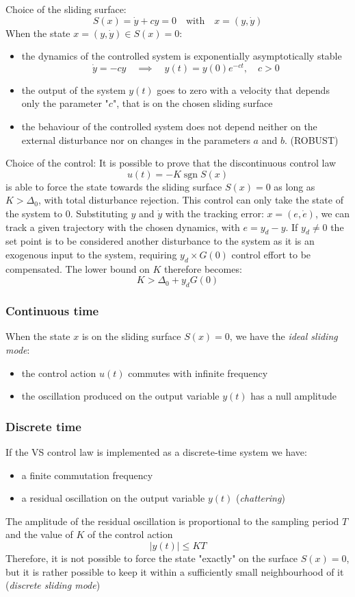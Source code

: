 \documentclass{book}
\DeclareMathOperator{\sgn}{sgn}
\begin{document}
Choice of the sliding surface:
\[
    S(x) = \dot{y} + cy = 0 \quad \text{with} \quad x=(y,\dot{y})
\]
When the state $x=(y,\dot{y})\in S(x)=0$:
\begin{itemize}
    \item the dynamics of the controlled system is exponentially asymptotically stable \[
            \dot{y} = -cy \quad \implies \quad y(t) = y(0)e^{-ct}, \quad c>0
    \]
    \item the output of the system $y(t)$ goes to zero with a velocity that depends only the parameter "$c$", that is on the chosen sliding surface
    \item the behaviour of the controlled system does not depend neither on the external disturbance nor on changes in the parameters $a$ and $b$. (ROBUST)
\end{itemize}

Choice of the control: It is possible to prove that the discontinuous control law
\[
    u(t) = -K \sgn S(x)
\]
is able to force the state towards the sliding surface $S(x)=0$ as long as $K>\Delta_0$, with total disturbance rejection. This control can only take the state of the system to 0. Substituting $y$ and $\dot{y}$ with the tracking error: $x=(e,\dot{e})$, we can track a given trajectory with the chosen dynamics, with $e=y_d-y$. If $y_d\neq 0 $ the set point is to be considered another disturbance to the system as it is an exogenous input to the system, requiring $y_d \times G(0)$ control effort to be compensated. The lower bound on $K$ therefore becomes:
\[
    K>\Delta_0+y_dG(0)
\]

\subsubsection{Continuous time}
When the state $x$ is on the sliding surface $S(x)=0$, we have the \emph{ideal sliding mode}: 
\begin{itemize}
    \item the control action $u(t)$ commutes with infinite frequency
    \item the oscillation produced on the output variable $y(t)$ has a null amplitude
\end{itemize}
\subsubsection{Discrete time}
If the VS control law is implemented as a discrete-time system we have:
\begin{itemize}
    \item a finite commutation frequency
    \item a residual oscillation on the output variable $y(t)$ (\emph{chattering})
\end{itemize}
The amplitude of the residual oscillation is proportional to the sampling period $T$ and the value of $K$ of the control action
\[
    |y(t)|\leq KT
\]
Therefore, it is not possible to force the state "exactly" on the surface $S(x)=0$, but it is rather possible to keep it within a sufficiently small neighbourhood of it (\emph{discrete sliding mode})
\end{document}
